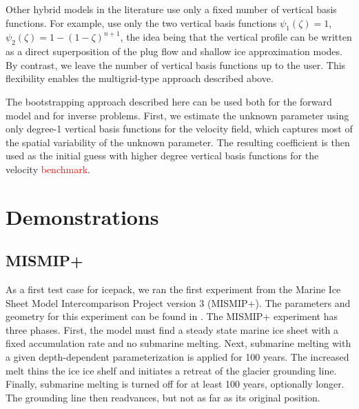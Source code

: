 \documentclass{article}
\theoremstyle{definition}
\theoremstyle{plain}
\begin{document}
Other hybrid models in the literature use only a fixed number of vertical basis functions.
For example, \citet{bassis2010hamilton} use only the two vertical basis functions $\psi_1(\zeta) = 1$, $\psi_2(\zeta) = 1 - (1 - \zeta)^{n + 1}$, the idea being that the vertical profile can be written as a direct superposition of the plug flow and shallow ice approximation modes.
By contrast, we leave the number of vertical basis functions up to the user.
This flexibility enables the multigrid-type approach described above.

The bootstrapping approach described here can be used both for the forward model and for inverse problems.
First, we estimate the unknown parameter using only degree-1 vertical basis functions for the velocity field, which captures most of the spatial variability of the unknown parameter.
The resulting coefficient is then used as the initial guess with higher degree vertical basis functions for the velocity \textcolor{red}{benchmark}.



\section{Demonstrations}

\subsection{MISMIP+}

As a first test case for icepack, we ran the first experiment from the Marine Ice Sheet Model Intercomparison Project version 3 (MISMIP+).
The parameters and geometry for this experiment can be found in \citet{asay2016experimental}.
The MISMIP+ experiment has three phases.
First, the model must find a steady state marine ice sheet with a fixed accumulation rate and no submarine melting.
Next, submarine melting with a given depth-dependent parameterization is applied for 100 years.
The increased melt thins the ice ice shelf and initiates a retreat of the glacier grounding line.
Finally, submarine melting is turned off for at least 100 years, optionally longer.
The grounding line then readvances, but not as far as its original position.
\end{document}
